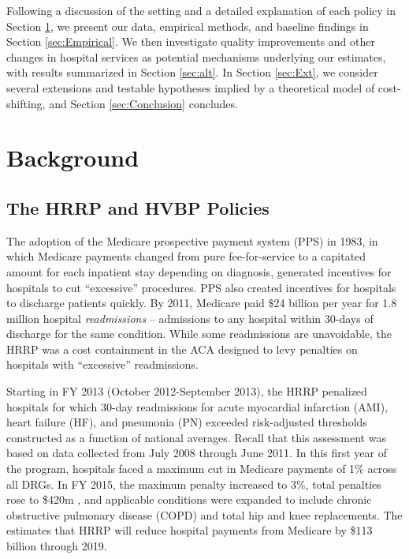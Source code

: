 \documentclass[12pt]{article}
\begin{document}
Following a discussion of the setting and a detailed explanation of each policy in Section \ref{sec:Background}, we present our data, empirical methods, and baseline findings in Section \ref{sec:Empirical}. We then investigate quality improvements and other changes in hospital services as potential mechanisms underlying our estimates, with results summarized in Section \ref{sec:alt}. In Section \ref{sec:Ext}, we consider several extensions and testable hypotheses implied by a theoretical model of cost-shifting, and Section \ref{sec:Conclusion} concludes.

\section{Background}
\label{sec:Background}

\subsection{The HRRP and HVBP Policies}
The adoption of the Medicare prospective payment system (PPS) in 1983, in which Medicare payments changed from pure fee-for-service to a capitated amount for each inpatient stay depending on diagnosis, generated incentives for hospitals to cut ``excessive'' procedures. PPS also created incentives for hospitals to discharge patients quickly.  By 2011, Medicare paid $\$$24 billion per year for 1.8 million hospital \textit{readmissions} -- admissions to any hospital within 30-days of discharge for the same condition.  While some readmissions are unavoidable, the HRRP was a cost containment in the ACA designed to levy penalties on hospitals with ``excessive'' readmissions.

Starting in FY 2013 (October 2012-September 2013), the HRRP penalized hospitals for which 30-day readmissions for acute myocardial infarction (AMI), heart failure (HF), and pneumonia (PN) exceeded risk-adjusted thresholds constructed as a function of national averages. Recall that this assessment was based on data collected from July 2008 through June 2011. In this first year of the program, hospitals faced a maximum cut in Medicare payments of 1\% across all DRGs. In FY 2015, the maximum penalty increased to 3\%, total penalties rose to \$420m \citep{rau2015}, and applicable conditions were expanded to include chronic obstructive pulmonary disease (COPD) and total hip and knee replacements. The \cite{cbo2010} estimates that HRRP will reduce hospital payments from Medicare by \$113 billion through 2019.
\end{document}
